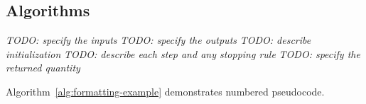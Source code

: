 \documentclass[a4paper,fleqn]{cas-sc}
\begin{document}
\FloatBarrier
\subsection{Algorithms}
\begin{algorithm}[htbp]
  \caption{Formatting example only: replace with the actual procedure}
  \label{alg:formatting-example}
  \begin{algorithmic}[1]
    \Require \textit{TODO: specify the inputs}
    \Ensure \textit{TODO: specify the outputs}
    \State \textit{TODO: describe initialization}
    \State \textit{TODO: describe each step and any stopping rule}
    \State \Return \textit{TODO: specify the returned quantity}
  \end{algorithmic}
\end{algorithm}
Algorithm~\ref{alg:formatting-example} demonstrates numbered pseudocode.
\FloatBarrier
\fi



\end{document}

